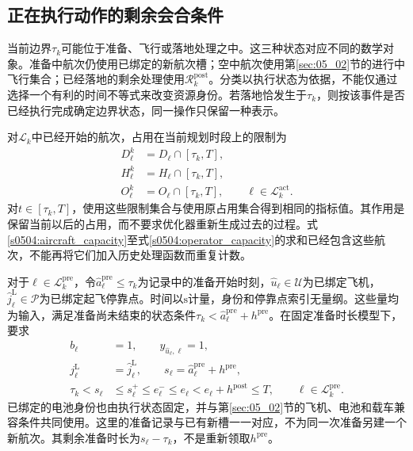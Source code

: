 \subsection{正在执行动作的剩余会合条件}

当前边界$\tau_k$可能位于准备、飞行或落地处理之中。这三种状态对应不同的数学对象。准备中航次仍使用已绑定的新航次槽；空中航次使用第\ref{sec:05_02}节的进行中飞行集合；已经落地的剩余处理使用$\mathcal R_k^{\mathrm{post}}$。分类以执行状态为依据，不能仅通过选择一个有利的时间不等式来改变资源身份。若落地恰发生于$\tau_k$，则按该事件是否已经执行完成确定边界状态，同一操作只保留一种表示。

对$\mathcal L_k$中已经开始的航次，占用在当前规划时段上的限制为
\begin{align}
 D_\ell^k&=D_\ell\cap[\tau_k,T],
 \label{s0504:remaining_aircraft_interval}\\
 H_\ell^k&=H_\ell\cap[\tau_k,T],
 \label{s0504:remaining_pad_intervals}\\
 O_\ell^k&=O_\ell\cap[\tau_k,T],
 \qquad\ell\in\mathcal L_k^{\mathrm{act}}.
 \label{s0504:remaining_operator_intervals}
\end{align}
对$t\in[\tau_k,T]$，使用这些限制集合与使用原占用集合得到相同的指标值。其作用是保留当前以后的占用，而不要求优化器重新生成过去的过程。式\eqref{s0504:aircraft_capacity}至式\eqref{s0504:operator_capacity}的求和已经包含这些航次，不能再将它们加入历史处理函数而重复计数。

对于$\ell\in\mathcal L_k^{\mathrm{pre}}$，令$\widehat a_\ell^{\mathrm{pre}}\le\tau_k$为记录中的准备开始时刻，$\widehat u_\ell\in\mathcal U$为已绑定飞机，$\widehat j_\ell^{\mathrm L}\in\mathcal P$为已绑定起飞停靠点。时间以$\mathrm{s}$计量，身份和停靠点索引无量纲。这些量均为输入，满足准备尚未结束的状态条件$\tau_k<\widehat a_\ell^{\mathrm{pre}}+h^{\mathrm{pre}}$。在固定准备时长模型下，要求
\begin{equation}
 \begin{aligned}
 b_\ell&=1,\qquad y_{\widehat u_\ell,\ell}=1,\\
 j_\ell^{\mathrm L}&=\widehat j_\ell^{\mathrm L},\qquad
 s_\ell=\widehat a_\ell^{\mathrm{pre}}+h^{\mathrm{pre}},\\
 \tau_k<s_\ell&\le s_\ell^+\le e_\ell^-\le e_\ell
 <e_\ell+h^{\mathrm{post}}\le T,
 \qquad\ell\in\mathcal L_k^{\mathrm{pre}}.
 \end{aligned}
 \label{s0504:prepared_slot_binding}
\end{equation}
已绑定的电池身份也由执行状态固定，并与第\ref{sec:05_02}节的飞机、电池和载车兼容条件共同使用。这里的准备记录与已有新槽一一对应，不为同一次准备另建一个新航次。其剩余准备时长为$s_\ell-\tau_k$，不是重新领取$h^{\mathrm{pre}}$。

